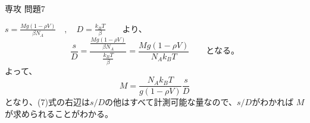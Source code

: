 \documentclass[fleqn]{jbook}
\begin{document}
\begin{answer}{専攻 問題7}{}
\begin{subanswers}
\begin{subsubanswers}
\SubSubAnswer
$\displaystyle{
s=\frac{Mg(1 - \rho V)}{\beta N_A}
\quad , \quad D=\frac{k_B T}{\beta} \qquad \mbox{より、}
}$\\
\[\frac{s}{D}=\frac{\frac{Mg(1 - \rho V)}{\beta N_A}}
{\frac{k_B T}{\beta}}
=\frac{M g (1-\rho V)}{N_A k_B T} \qquad \mbox{となる。}\]
よって、
\begin{equation}
M=\frac{N_A k_B T}{g(1-\rho V)}\frac{s}{D}
\end{equation}
となり、(7)式の右辺は$s/D$の他はすべて計測可能な量なので、$s/D$がわかれば
$M$が求められることがわかる。
\end{subsubanswers}
\end{subanswers}
\end{answer}
\end{document}
